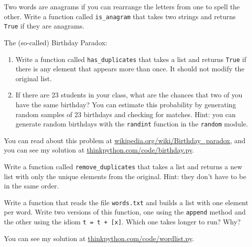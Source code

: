 \documentclass[10pt]{book}
\begin{document}
\begin{ex}
\label{anagram}


Two words are anagrams if you can rearrange the letters from one
to spell the other.  Write a function called \verb"is_anagram"
that takes two strings and returns {\tt True} if they are anagrams.
\end{ex}


\begin{ex}
\label{duplicate}

The (so-called) Birthday Paradox:

\begin{enumerate}


\item Write a function called \verb"has_duplicates" that takes
a list and returns {\tt True} if there is any element that
appears more than once.  It should not modify the original
list.

\item If there are 23 students in your class, what are the chances
that two of you have the same birthday?  You can estimate this
probability by generating random samples of 23 birthdays
and checking for matches.  Hint: you can generate random birthdays
with the {\tt randint} function in the {\tt random} module.


\end{enumerate}

You can read about this problem at
\url{wikipedia.org/wiki/Birthday_paradox}, and you can see my solution
at \url{thinkpython.com/code/birthday.py}.

\end{ex}


\begin{ex}


Write a function called \verb"remove_duplicates" that takes
a list and returns a new list with only the unique elements from
the original.  Hint: they don't have to be in the same order.
\end{ex}


\begin{ex}

Write a function that reads the file {\tt words.txt} and builds
a list with one element per word.  Write two versions of
this function, one using the {\tt append} method and the
other using the idiom {\tt t = t + [x]}.  Which one takes
longer to run?  Why?

You can see my solution at \url{thinkpython.com/code/wordlist.py}.
\end{ex}
\end{document}
